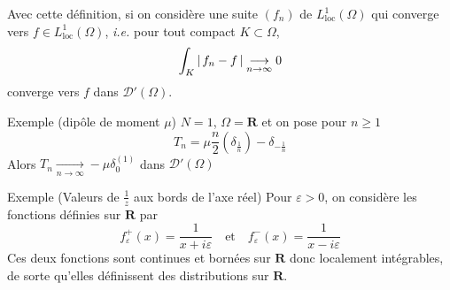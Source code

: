         Avec cette définition, si on considère une suite $(f_n)$ de $L^1_{\text{loc}}(\Omega)$ qui converge vers $f \in L^{1}_{\text{loc}}(\Omega)$, \textit{i.e.} pour tout compact $K \subset \Omega$, 
        \[ \int_K \left\lvert \, f_n - f \, \right\rvert \underset{n \to \infty}{\longrightarrow} 0 \]   
        converge vers $f$ dans $\mathcal{D}'(\Omega)$.

        \begin{demo}{Exemple (dipôle de moment $\mu$)}
            $N = 1$, $\Omega = \mathbf{R}$ et on pose pour $n \geq 1$
            \[ T_n = \mu \frac{n}{2}\left(\delta_{\frac{1}{n}}\right) - \delta_{-\frac{1}{n}} \]   
            Alors $T_n \underset{n \to \infty}{\longrightarrow} -\mu \delta_{0}^{(1)}$ dans $\mathcal{D}'(\Omega)$
        \end{demo}

        \begin{demo}{Exemple (Valeurs de $\frac{1}{z}$ aux bords de l’axe réel)}
            Pour $\varepsilon > 0$, on considère les fonctions définies sur $\mathbf{R}$ par 
            \[ f_{\varepsilon}^+(x) = \frac{1}{x + i\varepsilon} \quad \text{et} \quad f_{\varepsilon}^-(x) = \frac{1}{x - i\varepsilon} \]   
            Ces deux fonctions sont continues et bornées sur $\mathbf{R}$ donc localement intégrables, de sorte qu’elles définissent des distributions sur $\mathbf{R}$. 


\end{demo}
